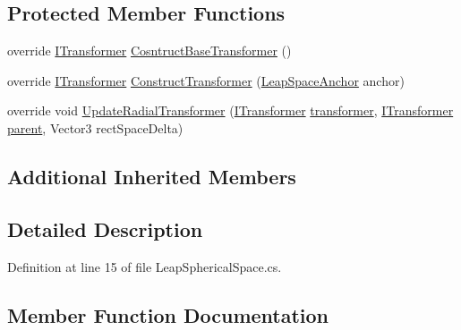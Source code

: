\subsection*{Protected Member Functions}
\begin{DoxyCompactItemize}
\item 
override \mbox{\hyperlink{interface_leap_1_1_unity_1_1_space_1_1_i_transformer}{I\+Transformer}} \mbox{\hyperlink{class_leap_1_1_unity_1_1_space_1_1_leap_spherical_space_af44aeded1cf4e35a2e780a6caa02b674}{Cosntruct\+Base\+Transformer}} ()
\item 
override \mbox{\hyperlink{interface_leap_1_1_unity_1_1_space_1_1_i_transformer}{I\+Transformer}} \mbox{\hyperlink{class_leap_1_1_unity_1_1_space_1_1_leap_spherical_space_ac252ca6d47afef536236b55a34e3f416}{Construct\+Transformer}} (\mbox{\hyperlink{class_leap_1_1_unity_1_1_space_1_1_leap_space_anchor}{Leap\+Space\+Anchor}} anchor)
\item 
override void \mbox{\hyperlink{class_leap_1_1_unity_1_1_space_1_1_leap_spherical_space_aaae3bed7e24ee9a7ccc564ff19888419}{Update\+Radial\+Transformer}} (\mbox{\hyperlink{interface_leap_1_1_unity_1_1_space_1_1_i_transformer}{I\+Transformer}} \mbox{\hyperlink{class_leap_1_1_unity_1_1_space_1_1_leap_space_anchor_a6f98d35d75f83e2ff2c978715520c836}{transformer}}, \mbox{\hyperlink{interface_leap_1_1_unity_1_1_space_1_1_i_transformer}{I\+Transformer}} \mbox{\hyperlink{class_leap_1_1_unity_1_1_space_1_1_leap_space_anchor_a8df76f5c9ba6a0f169880fec6bca557b}{parent}}, Vector3 rect\+Space\+Delta)
\end{DoxyCompactItemize}
\subsection*{Additional Inherited Members}


\subsection{Detailed Description}


Definition at line 15 of file Leap\+Spherical\+Space.\+cs.



\subsection{Member Function Documentation}
\mbox{\label{class_leap_1_1_unity_1_1_space_1_1_leap_spherical_space_ac252ca6d47afef536236b55a34e3f416}} 
